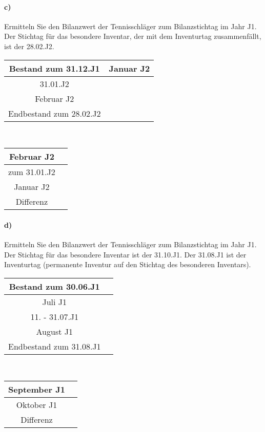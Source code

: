 \documentclass[paper=a4, fontsize=11pt]{scrartcl}
\numberwithin{equation}{section}
\numberwithin{figure}{section}
\numberwithin{table}{section}
\begin{document}
\paragraph{c)}

Ermitteln Sie den Bilanzwert der Tennisschläger zum Bilanzstichtag im Jahr J1. Der Stichtag für das besondere Inventar, der mit dem Inventurtag zusammenfällt, ist der 28.02.J2. \\

\begin{tabular}{c|c}
\hline
Bestand zum 31.12.J1 & 
\hline
Januar J2 & \\
\hline
31.01.J2 & \\
\hline
Februar J2 & \\
\hline
Endbestand zum 28.02.J2 & \\
\hline
\end{tabular}
\\

\begin{tabular}{c|c}
\hline
Februar J2 & \\
\hline
zum 31.01.J2 & \\
\hline
Januar J2 & \\
\hline 
Differenz & \\
\hline
\end{tabular}

\paragraph{d)}

Ermitteln Sie den Bilanzwert der Tennisschläger zum Bilanzstichtag im Jahr J1. Der Stichtag für das besondere Inventar ist der 31.10.J1. Der 31.08.J1 ist der Inventurtag (permanente Inventur auf den Stichtag des besonderen Inventars).  \\

\begin{tabular}{c|c}
\hline
Bestand zum 30.06.J1 & \\
\hline
Juli J1 & \\
\hline
11. - 31.07.J1 & \\
\hline
August J1 & \\
\hline
Endbestand zum 31.08.J1 & \\
\hline
\end{tabular}
\\

\begin{tabular}{c|c}
\hline
September J1 & \\
\hline
Oktober J1 & \\
\hline
Differenz & \\
\hline
\end{tabular}
\\
\end{document}
